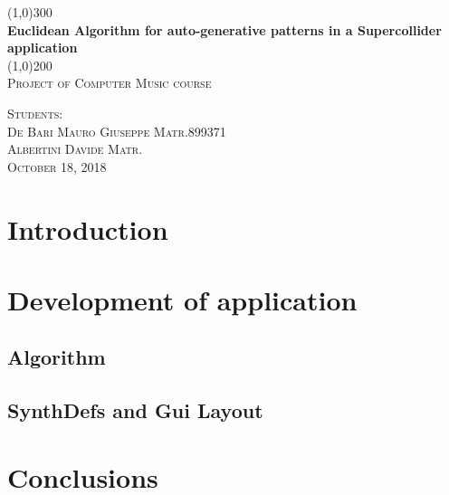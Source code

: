 \documentclass{report}
\begin{document}
\begin{titlepage}
	\begin{center}
	\line(1,0){300}\\
	[0.25in]
	\huge{\bfseries Euclidean Algorithm for auto-generative patterns in a Supercollider application}\\
	[2mm]
	\line(1,0){200}\\
	[1.5cm]
	\textsc{\LARGE Project of Computer Music course}\\
	[10.75cm]
	\end{center}
	\begin{flushright}
	\textsc{\large  Students:\\
	De Bari Mauro Giuseppe Matr.899371 \\
	Albertini Davide Matr. \\
	October 18, 2018 \\}
	\end{flushright}
\end{titlepage}

\tableofcontents
\newpage

\section{Introduction}


\section{Development of application}

\subsection{Algorithm}

\subsection{SynthDefs and Gui Layout}

\section{Conclusions}

\end{document}
